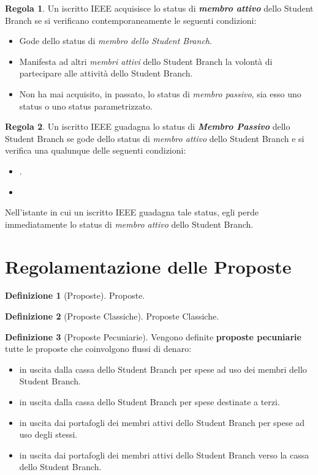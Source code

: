 \documentclass[]{article}
\theoremstyle{definition}
\newtheorem{defn}{Definizione}[section]
\newtheorem{regl}{Regola}[section]
\renewcommand{\i}[1]{\textit{#1}}
\renewcommand{\b}[1]{\textbf{#1}}
\begin{document}
\begin{regl}
	Un iscritto IEEE acquisisce lo status di \b{\i{membro attivo}} dello Student Branch se si verificano contemporaneamente le seguenti condizioni:
	\begin{itemize}
		\item Gode dello status di \i{membro dello Student Branch}.
		\item Manifesta ad altri \i{membri attivi} dello Student Branch la volontà di partecipare alle attività dello Student Branch.
		\item Non ha mai acquisito, in passato, lo status di \i{membro passivo}, sia esso uno status o uno status parametrizzato.
	\end{itemize}
\end{regl}


\begin{regl}
	Un iscritto IEEE guadagna lo status di \b{\i{Membro Passivo}} dello Student Branch se gode dello status di \i{membro attivo} dello Student Branch e si verifica una qualunque delle seguenti condizioni:
	\begin{itemize}
		\item .
		\item 
	\end{itemize}
	Nell'istante in cui un iscritto IEEE guadagna tale status, egli perde immediatamente lo status di \i{membro attivo} dello Student Branch.
\end{regl}

\section{Regolamentazione delle Proposte}


\begin{defn}[Proposte]
	Proposte.
\end{defn}

\begin{defn}[Proposte Classiche]
	Proposte Classiche.
\end{defn}

\begin{defn}[Proposte Pecuniarie]
	Vengono definite \textbf{proposte pecuniarie} tutte le proposte che coinvolgono flussi di denaro:
	\begin{itemize}
		\item in uscita dalla cassa dello Student Branch per spese ad uso dei membri dello Student Branch.
		\item in uscita dalla cassa dello Student Branch per spese destinate a terzi.
		\item in uscita dai portafogli dei membri attivi dello Student Branch per spese ad uso degli stessi. %
		\item in uscita dai portafogli dei membri attivi dello Student Branch verso la cassa dello Student Branch.
	\end{itemize}
\end{defn}
\end{document}
